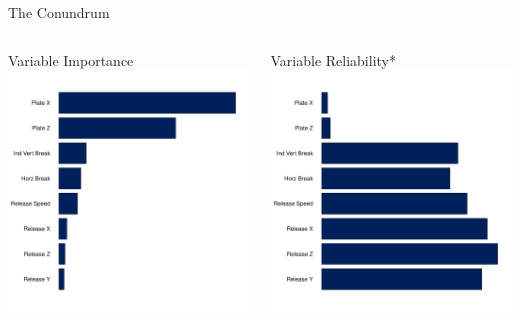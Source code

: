 \documentclass{beamer}
\begin{document}
  \begin{frame}{The Conundrum}
    \begin{columns}
      \begin{column}{0.5\textwidth}
        \centering
        Variable Importance\\
        \includegraphics[width = \textwidth]{images/feature_importance.pdf}
      \end{column}
      \begin{column}{0.5\textwidth}
        \centering
        Variable Reliability*\\
        \includegraphics[width = \textwidth]{images/feature_reliability.pdf}

\end{column}
\end{columns}
\end{frame}
\end{document}
